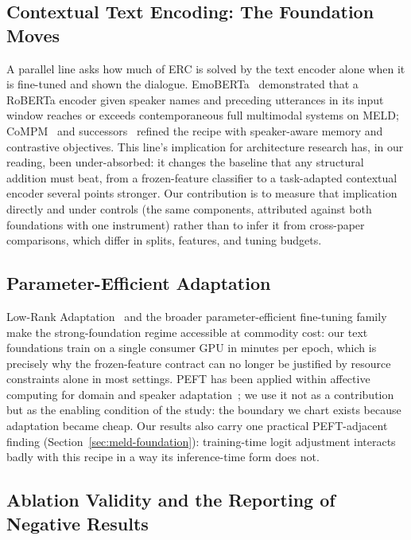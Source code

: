 \subsection{Contextual Text Encoding: The Foundation Moves}

A parallel line asks how much of ERC is solved by the text encoder alone when it is fine-tuned and shown the dialogue. EmoBERTa~\cite{emoberta2021} demonstrated that a RoBERTa encoder given speaker names and preceding utterances in its input window reaches or exceeds contemporaneous full multimodal systems on MELD; CoMPM~\cite{compm2021} and successors~\cite{spcl2022} refined the recipe with speaker-aware memory and contrastive objectives. This line's implication for architecture research has, in our reading, been under-absorbed: it changes the baseline that any structural addition must beat, from a frozen-feature classifier to a task-adapted contextual encoder several points stronger. Our contribution is to measure that implication directly and under controls (the same components, attributed against both foundations with one instrument) rather than to infer it from cross-paper comparisons, which differ in splits, features, and tuning budgets.

\subsection{Parameter-Efficient Adaptation}

Low-Rank Adaptation~\cite{hu2022lora} and the broader parameter-efficient fine-tuning family make the strong-foundation regime accessible at commodity cost: our text foundations train on a single consumer GPU in minutes per epoch, which is precisely why the frozen-feature contract can no longer be justified by resource constraints alone in most settings. PEFT has been applied within affective computing for domain and speaker adaptation~\cite{feng2023peftser}; we use it not as a contribution but as the enabling condition of the study: the boundary we chart exists because adaptation became cheap. Our results also carry one practical PEFT-adjacent finding (Section~\ref{sec:meld-foundation}): training-time logit adjustment interacts badly with this recipe in a way its inference-time form does not.

\subsection{Ablation Validity and the Reporting of Negative Results}

